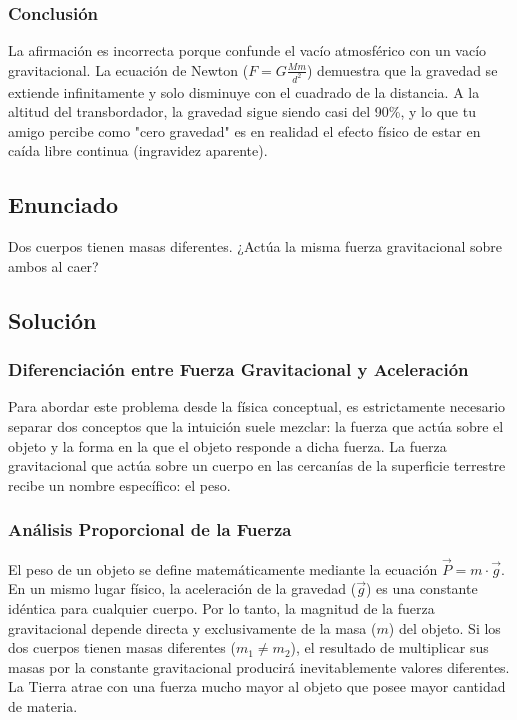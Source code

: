 \documentclass[12pt]{article}
\begin{document}
\subsubsection*{Conclusión}
La afirmación es incorrecta porque confunde el vacío atmosférico con un vacío gravitacional. La ecuación de Newton ($F = G \frac{Mm}{d^2}$) demuestra que la gravedad se extiende infinitamente y solo disminuye con el cuadrado de la distancia. A la altitud del transbordador, la gravedad sigue siendo casi del 90\%, y lo que tu amigo percibe como "cero gravedad" es en realidad el efecto físico de estar en caída libre continua (ingravidez aparente).

\newpage

\subsection*{Enunciado}
Dos cuerpos tienen masas diferentes. ¿Actúa la misma fuerza gravitacional sobre ambos al caer?

\subsection*{Solución}

\subsubsection*{Diferenciación entre Fuerza Gravitacional y Aceleración}
Para abordar este problema desde la física conceptual, es estrictamente necesario separar dos conceptos que la intuición suele mezclar: la fuerza que actúa sobre el objeto y la forma en la que el objeto responde a dicha fuerza. La fuerza gravitacional que actúa sobre un cuerpo en las cercanías de la superficie terrestre recibe un nombre específico: el peso. 

\subsubsection*{Análisis Proporcional de la Fuerza}
El peso de un objeto se define matemáticamente mediante la ecuación $\vec{P} = m \cdot \vec{g}$. En un mismo lugar físico, la aceleración de la gravedad ($\vec{g}$) es una constante idéntica para cualquier cuerpo. Por lo tanto, la magnitud de la fuerza gravitacional depende directa y exclusivamente de la masa ($m$) del objeto. Si los dos cuerpos tienen masas diferentes ($m_1 \neq m_2$), el resultado de multiplicar sus masas por la constante gravitacional producirá inevitablemente valores diferentes. La Tierra atrae con una fuerza mucho mayor al objeto que posee mayor cantidad de materia.
\end{document}
